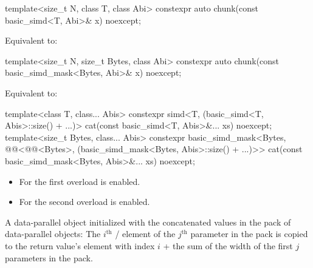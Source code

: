 \begin{itemdecl}
template<size_t N, class T, class Abi>
  constexpr auto chunk(const basic_simd<T, Abi>& x) noexcept;
\end{itemdecl}

\begin{itemdescr}
\pnum
\effects
Equivalent to: 
\end{itemdescr}

\begin{itemdecl}
template<size_t N, size_t Bytes, class Abi>
  constexpr auto chunk(const basic_simd_mask<Bytes, Abi>& x) noexcept;
\end{itemdecl}

\begin{itemdescr}
\pnum
\effects
Equivalent to: 
\end{itemdescr}

\begin{itemdecl}
template<class T, class... Abis>
  constexpr simd<T, (basic_simd<T, Abis>::size() + ...)>
    cat(const basic_simd<T, Abis>&... xs) noexcept;
template<size_t Bytes, class... Abis>
  constexpr basic_simd_mask<Bytes, @@<@@<Bytes>,
                            (basic_simd_mask<Bytes, Abis>::size() + ...)>>
    cat(const basic_simd_mask<Bytes, Abis>&... xs) noexcept;
\end{itemdecl}

\begin{itemdescr}
\pnum
\constraints
\begin{itemize}
 \item
   For the first overload 
   is enabled.
 \item
   For the second overload
    is enabled.
\end{itemize}

\pnum
\returns
A data-parallel object initialized with the concatenated values in the
 pack of data-parallel objects: The $i^\text{th}$
/ element of the $j^\text{th}$
parameter in the  pack is copied to the return value's element with
index $i$ + the sum of the width of the first $j$ parameters in the 
pack.
\end{itemdescr}

